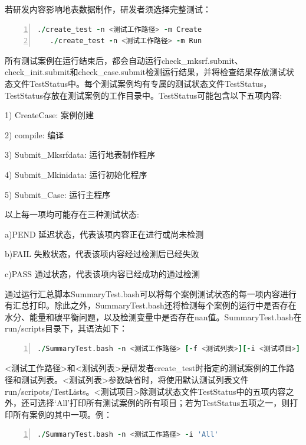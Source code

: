 若研发内容影响地表数据制作，研发者须选择完整测试：

\begin{lstlisting}[language=fortran, basicstyle=\linespread{1.0}\footnotesize\ttfamily, commentstyle=\color{olive}, numbers=left, numberstyle=\tiny, xleftmargin=1.5em,xrightmargin=0em, aboveskip=1em]
   ./create_test -n <测试工作路径> -m Create
   ./create_test -n <测试工作路径> -m Run
\end{lstlisting}

所有测试案例在运行结束后，都会自动运行check\_mksrf.submit、check\_init.submit和check\_case.submit检测运行结果，并将检查结果存放测试状态文件TestStatus中。每个测试案例均有专属的测试状态文件TestStatus，TestStatus存放在测试案例的工作目录中。TestStatus可能包含以下五项内容:

1) CreateCase: 案例创建

2) compile: 编译

3) Submit\_Mksrfdata: 运行地表制作程序

4) Submit\_Mkinidata: 运行初始化程序

5) Submit\_Case: 运行主程序

以上每一项均可能存在三种测试状态:

a)PEND 延迟状态，代表该项内容正在进行或尚未检测

b)FAIL 失败状态，代表该项内容经过检测后已经失败

c)PASS 通过状态，代表该项内容已经成功的通过检测

通过运行汇总脚本SummaryTest.bash可以将每个案例测试状态的每一项内容进行有汇总打印。除此之外，SummaryTest.bash还将检测每个案例的运行中是否存在水分、能量和碳平衡问题，以及检测变量中是否存在nan值。SummaryTest.bash在run/scripts目录下，其语法如下：

\begin{lstlisting}[language=fortran, basicstyle=\linespread{1.0}\footnotesize\ttfamily, commentstyle=\color{olive}, numbers=left, numberstyle=\tiny, xleftmargin=1.5em,xrightmargin=0em, aboveskip=1em]
   ./SummaryTest.bash -n <测试工作路径> [-f <测试列表>][-i <测试项目>]
\end{lstlisting}

<测试工作路径>和<测试列表>是研发者create\_test时指定的测试案例的工作路径和测试列表。<测试列表>参数缺省时，将使用默认测试列表文件run/scripots/TestLists。<测试项目>除测试状态文件TestStatus中的五项内容之外，还可选择‘All’打印所有测试案例的所有项目；若为TestStatus五项之一，则打印所有案例的其中一项。例：

\begin{lstlisting}[language=fortran, basicstyle=\linespread{1.0}\footnotesize\ttfamily, commentstyle=\color{olive}, numbers=left, numberstyle=\tiny, xleftmargin=1.5em,xrightmargin=0em, aboveskip=1em]
   ./SummaryTest.bash -n <测试工作路径> -i 'All'
\end{lstlisting}

